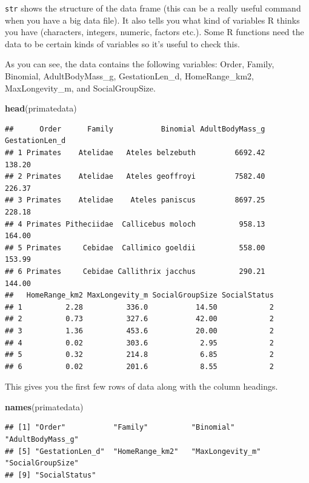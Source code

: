 \documentclass[]{book}
\newenvironment{Shaded}{\begin{snugshade}}{\end{snugshade}}
\newcommand{\KeywordTok}[1]{\textcolor[rgb]{0.13,0.29,0.53}{\textbf{{#1}}}}
\newcommand{\NormalTok}[1]{{#1}}
\begin{document}
\texttt{str} shows the structure of the data frame (this can be a really
useful command when you have a big data file). It also tells you what
kind of variables R thinks you have (characters, integers, numeric,
factors etc.). Some R functions need the data to be certain kinds of
variables so it's useful to check this.

As you can see, the data contains the following variables: Order,
Family, Binomial, AdultBodyMass\_g, GestationLen\_d, HomeRange\_km2,
MaxLongevity\_m, and SocialGroupSize.

\begin{Shaded}
\begin{Highlighting}[]
\KeywordTok{head}\NormalTok{(primatedata)}
\end{Highlighting}
\end{Shaded}

\begin{verbatim}
##      Order      Family           Binomial AdultBodyMass_g GestationLen_d
## 1 Primates    Atelidae   Ateles belzebuth         6692.42         138.20
## 2 Primates    Atelidae   Ateles geoffroyi         7582.40         226.37
## 3 Primates    Atelidae    Ateles paniscus         8697.25         228.18
## 4 Primates Pitheciidae  Callicebus moloch          958.13         164.00
## 5 Primates     Cebidae  Callimico goeldii          558.00         153.99
## 6 Primates     Cebidae Callithrix jacchus          290.21         144.00
##   HomeRange_km2 MaxLongevity_m SocialGroupSize SocialStatus
## 1          2.28          336.0           14.50            2
## 2          0.73          327.6           42.00            2
## 3          1.36          453.6           20.00            2
## 4          0.02          303.6            2.95            2
## 5          0.32          214.8            6.85            2
## 6          0.02          201.6            8.55            2
\end{verbatim}

This gives you the first few rows of data along with the column
headings.

\begin{Shaded}
\begin{Highlighting}[]
\KeywordTok{names}\NormalTok{(primatedata)}
\end{Highlighting}
\end{Shaded}

\begin{verbatim}
## [1] "Order"           "Family"          "Binomial"        "AdultBodyMass_g"
## [5] "GestationLen_d"  "HomeRange_km2"   "MaxLongevity_m"  "SocialGroupSize"
## [9] "SocialStatus"
\end{verbatim}
\end{document}
